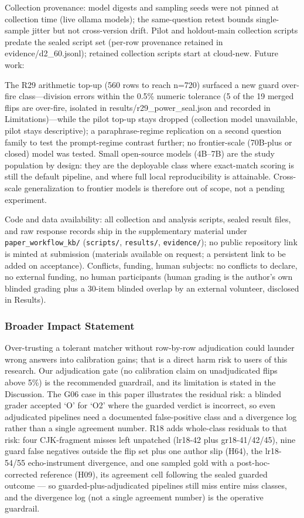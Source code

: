 \documentclass[10pt]{article} %
\begin{document}
Collection provenance: model digests and sampling seeds were not pinned at collection time (live ollama models); the same-question retest bounds single-sample jitter but not cross-version drift. Pilot and holdout-main collection scripts predate the sealed script set (per-row provenance retained in evidence/d2\_60.jsonl); retained collection scripts start at cloud-new. Future work:

The R29 arithmetic top-up (560 rows to reach n=720) surfaced a new guard over-fire class---division errors within the 0.5\% numeric tolerance (5 of the 19 merged flips are over-fire, isolated in results/r29\_power\_seal.json and recorded in Limitations)---while the pilot top-up stays dropped (collection model unavailable, pilot stays descriptive); a paraphrase-regime replication on a second question family to test the prompt-regime contrast further; no frontier-scale (70B-plus or closed) model was tested. Small open-source models (4B--7B) are the study population by design: they are the deployable class where exact-match scoring is still the default pipeline, and where full local reproducibility is attainable. Cross-scale generalization to frontier models is therefore out of scope, not a pending experiment.

Code and data availability: all collection and analysis scripts, sealed result files, and raw response records ship in the supplementary material under \texttt{paper\_workflow\_kb/} (\texttt{scripts/}, \texttt{results/}, \texttt{evidence/}); no public repository link is minted at submission (materials available on request; a persistent link to be added on acceptance). Conflicts, funding, human subjects: no conflicts to declare, no external funding, no human participants (human grading is the author's own blinded grading plus a 30-item blinded overlap by an external volunteer, disclosed in Results).

\subsubsection*{Broader Impact Statement}
Over-trusting a tolerant matcher without row-by-row adjudication could launder wrong answers into calibration gains; that is a direct harm risk to users of this research. Our adjudication gate (no calibration claim on unadjudicated flips above 5\%) is the recommended guardrail, and its limitation is stated in the Discussion.
The G06 case in this paper illustrates the residual risk: a blinded grader accepted `O' for `O2' where the guarded verdict is incorrect, so even adjudicated pipelines need a documented false-positive class and a divergence log rather than a single agreement number. R18 adds whole-class residuals to that risk: four CJK-fragment misses left unpatched (lr18-42 plus gr18-41/42/45), nine guard false negatives outside the flip set plus one author slip (H64), the lr18-54/55 echo-instrument divergence, and one sampled gold with a post-hoc-corrected reference (H09), its agreement cell following the sealed guarded outcome --- so guarded-plus-adjudicated pipelines still miss entire miss classes, and the divergence log (not a single agreement number) is the operative guardrail.
\end{document}
